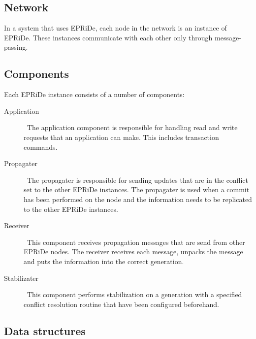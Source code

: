 


\subsection{Network} %
\label{sub:network}

In a system that uses EPRiDe, each node in the network is an instance of EPRiDe. These instances communicate with each other only through message-passing. 

\subsection{Components} %
\label{sub:components}

Each EPRiDe instance consists of a number of components:

\begin{description}
	\item[Application] \
		The application component is responsible for handling read and write requests that an application can make. This includes transaction commands.
		
	\item[Propagater] \
		The propagater is responsible for sending updates that are in the conflict set to the other EPRiDe instances. The propagater is used  when a commit has been performed on the node and the information needs to be replicated to the other EPRiDe instances.
		
	\item[Receiver] \
		This component receives propagation messages that are send from other EPRiDe nodes. The receiver receives each message, unpacks the message and puts the information into the correct generation.
		
	\item[Stabilizater] \
		This component performs stabilization on a generation with a specified conflict resolution routine that have been configured beforehand.
\end{description}


\subsection{Data structures} %
\label{sub:datastructures}


